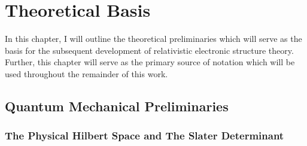 \chapter{Theoretical Basis}
\label{ch:Theory}

In this chapter, I will outline the theoretical preliminaries which will serve as the basis
for the subsequent development of relativistic electronic structure theory. Further, this
chapter will serve as the primary source of notation which will be used throughout the
remainder of this work. 

\section{Quantum Mechanical Preliminaries}
\label{sec:QM}

\subsection{The Physical Hilbert Space and The Slater Determinant}
\label{sec:SD}

